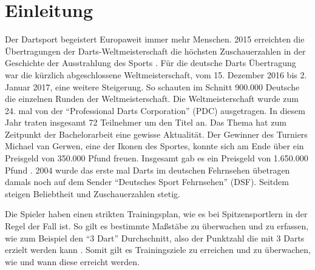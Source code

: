 
\chapter{Einleitung}
\label{chap:intro}



Der Dartsport begeistert Europaweit immer mehr Menschen. 2015 erreichten die Übertragungen der Darts-Weltmeisterschaft die höchsten Zuschauerzahlen in der Geschichte der Ausstrahlung des Sports \autocite{quotenmeter2017}. Für die deutsche Darts Übertragung war die kürzlich abgeschlossene Weltmeisterschaft, vom 15. Dezember 2016 bis 2. Januar 2017, eine weitere Steigerung. So schauten im Schnitt 900.000 Deutsche die einzelnen Runden der Weltmeisterschaft. Die Weltmeisterschaft wurde zum 24. mal von der "`Professional Darts Corporation"' (PDC) ausgetragen. In diesem Jahr traten insgesamt 72 Teilnehmer um den Titel an. Das Thema hat zum Zeitpunkt der Bachelorarbeit eine gewisse Aktualität. 
Der Gewinner des Turniers Michael van Gerwen, eine der Ikonen des Sportes, konnte sich am Ende über ein Preisgeld von 350.000 Pfund freuen. Insgesamt gab es ein Preisgeld von 1.650.000 Pfund \autocite{PDC2016}.
2004 wurde das erste mal Darts im deutschen Fehrnsehen übetragen damals noch auf dem Sender "`Deutsches Sport Fehrnsehen"' (DSF)\autocite{GaOn2016}. Seitdem steigen Beliebtheit und Zuschauerzahlen stetig.

Die Spieler haben einen strikten Trainingsplan, wie es bei Spitzensportlern in der Regel der Fall ist. So gilt es bestimmte Maßstäbe zu überwachen und zu erfassen, wie zum Beispiel den "`3 Dart"' Durchschnitt, also der Punktzahl die mit 3 Darts erzielt werden kann \autocite[98-100]{dph2015}.
Somit gilt es Trainingsziele zu erreichen und zu überwachen, wie und wann diese erreicht werden.

